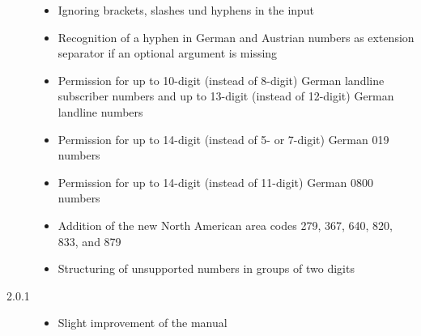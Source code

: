 \documentclass[numbers=noenddot]{scrreprt}
\begin{document}
\begin{description}
\begin{itemize}
\item Ignoring brackets, slashes und hyphens in the input
\item Recognition of a hyphen in German and Austrian numbers as extension separator if an optional argument is missing
\item Permission for up to 10-digit (instead of 8-digit) German landline subscriber numbers and up to 13-digit (instead of 12-digit) German landline numbers
\item Permission for up to 14-digit (instead of 5- or 7-digit) German 019 numbers
\item Permission for up to 14-digit (instead of 11-digit) German 0800 numbers
\item Addition of the new North American area codes 279, 367, 640, 820, 833, and 879
\item Structuring of unsupported numbers in groups of two digits
\end{itemize}
\item[2.0.1] 
\begin{itemize}
\item Slight improvement of the manual
\end{itemize}

\end{description}
\end{document}
